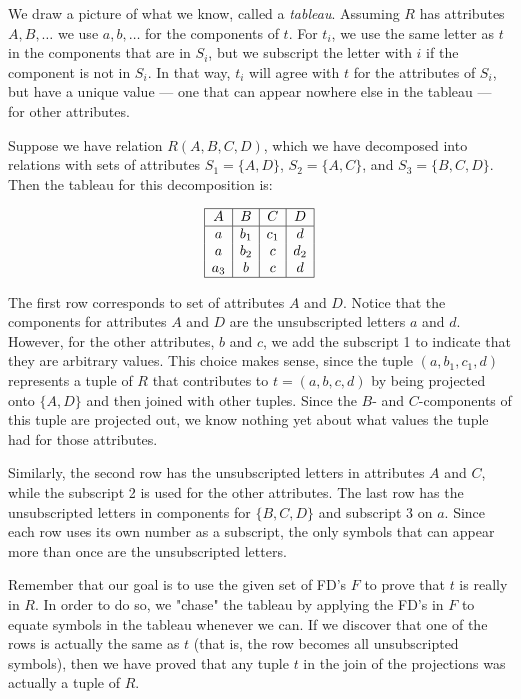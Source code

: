   We draw a picture of what we know, called a \emph{tableau}. Assuming $R$ has attributes $A,B,\ldots$ we use $a,b,\ldots$ for the components of $t$. For $t_i$, we use the same letter as $t$ in the components that are in $S_i$, but we subscript the letter with $i$ if the component is not in $S_i$. In that way, $t_i$ will agree with $t$ for the attributes of $S_i$, but have a unique value — one that can appear nowhere else in the tableau — for other attributes.

  \begin{example}
    Suppose we have relation $R(A,B,C,D)$, which we have decomposed into relations with sets of attributes $S_1 = \{A,D\}$, $S_2 = \{A,C\}$, and $S_3 = \{B,C,D\}$. Then the tableau for this decomposition is:

    \[
    \begin{array}{|c|c|c|c|}
    \hline
    A & B & C & D \\
    \hline
    a & b_1 & c_1 & d \\
    a & b_2 & c & d_2 \\
    a_3 & b & c & d \\
    \hline
    \end{array}
    \]

    The first row corresponds to set of attributes $A$ and $D$. Notice that the components for attributes $A$ and $D$ are the unsubscripted letters $a$ and $d$. However, for the other attributes, $b$ and $c$, we add the subscript 1 to indicate that they are arbitrary values. This choice makes sense, since the tuple $(a,b_1,c_1,d)$ represents a tuple of $R$ that contributes to $t = (a,b,c,d)$ by being projected onto $\{A,D\}$ and then joined with other tuples. Since the $B$- and $C$-components of this tuple are projected out, we know nothing yet about what values the tuple had for those attributes.

    Similarly, the second row has the unsubscripted letters in attributes $A$ and $C$, while the subscript 2 is used for the other attributes. The last row has the unsubscripted letters in components for $\{B,C,D\}$ and subscript 3 on $a$. Since each row uses its own number as a subscript, the only symbols that can appear more than once are the unsubscripted letters.
  \end{example}

  Remember that our goal is to use the given set of FD's $F$ to prove that $t$ is really in $R$. In order to do so, we "chase" the tableau by applying the FD's in $F$ to equate symbols in the tableau whenever we can. If we discover that one of the rows is actually the same as $t$ (that is, the row becomes all unsubscripted symbols), then we have proved that any tuple $t$ in the join of the projections was actually a tuple of $R$.

